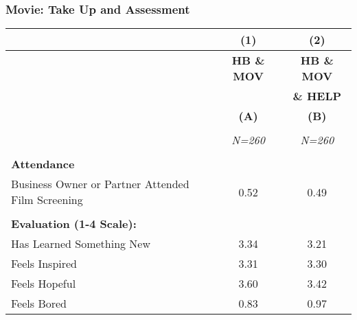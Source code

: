 \documentclass[10pt]{beamer}
\begin{document}
\begin{frame}
\frametitle{Movie: Take Up and Assessment}
{\scriptsize{\begin{table}[htbp]
  \centering
    \begin{tabular}{lcc}
    \hline
   	& (1)   					&(2)   						 \\
    \hline
  	& \textbf{HB \& MOV} 		& \textbf{HB \& MOV}		  \\
  	& 							& \textbf{\& HELP}			\\
   	& \textbf{(A)}   			& \textbf{(B)}   			 \\
 	&							&							\\
   	& \textit{N=260} 			& \textit{N=260} 			 \\
   \hline
   														&		&		 \\
    \textbf{Attendance} 								&       &         \\
    Business Owner or Partner Attended Film Screening 	& 0.52  & 0.49   \\
	&       &       \\
    \textbf{Evaluation (1-4 Scale):}	&       &        \\
    Has Learned Something New	& 3.34  & 3.21  \\
    Feels Inspired 				& 3.31  & 3.30   \\
    Feels Hopeful 				& 3.60  & 3.42   \\
    Feels Bored 				& 0.83  & 0.97    \\
    \end{tabular}

\end{table}}}

\end{frame}
\end{document}
